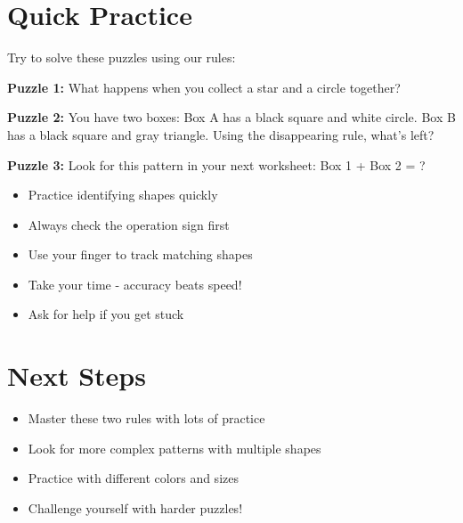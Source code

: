 \documentclass[a4paper,11pt]{article}
\begin{document}
\section{Quick Practice}

Try to solve these puzzles using our rules:

\textbf{Puzzle 1:} What happens when you collect a star and a circle together?

\textbf{Puzzle 2:} You have two boxes: Box A has a black square and white circle. Box B has a black square and gray triangle. Using the disappearing rule, what's left?

\textbf{Puzzle 3:} Look for this pattern in your next worksheet: Box 1 + Box 2 = ?

\vspace{1cm}

\begin{tcolorbox}[colback=gray!10!white,colframe=gray!50!black,title=\textbf{Success Tips}]
\begin{itemize}
    \item Practice identifying shapes quickly
    \item Always check the operation sign first
    \item Use your finger to track matching shapes
    \item Take your time - accuracy beats speed!
    \item Ask for help if you get stuck
\end{itemize}
\end{tcolorbox}

\section{Next Steps}

\begin{itemize}
    \item Master these two rules with lots of practice
    \item Look for more complex patterns with multiple shapes
    \item Practice with different colors and sizes
    \item Challenge yourself with harder puzzles!
\end{itemize}
\end{document}
